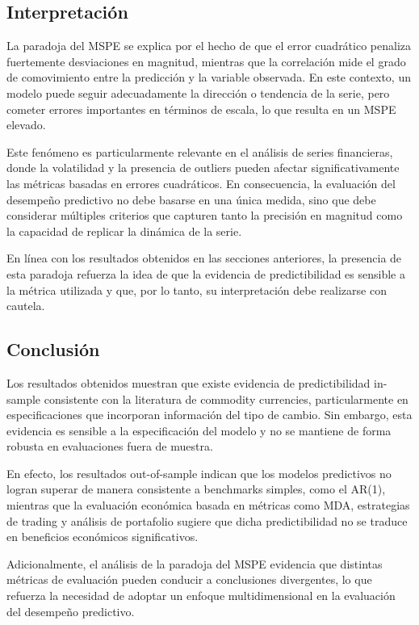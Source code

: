 \documentclass[11pt,a4paper]{article}
\begin{document}
	\subsection{Interpretación}
	La paradoja del MSPE se explica por el hecho de que el error cuadrático penaliza fuertemente desviaciones en magnitud, mientras que la correlación mide el grado de comovimiento entre la predicción y la variable observada. En este contexto, un modelo puede seguir adecuadamente la dirección o tendencia de la serie, pero cometer errores importantes en términos de escala, lo que resulta en un MSPE elevado.
	
	Este fenómeno es particularmente relevante en el análisis de series financieras, donde la volatilidad y la presencia de outliers pueden afectar significativamente las métricas basadas en errores cuadráticos. En consecuencia, la evaluación del desempeño predictivo no debe basarse en una única medida, sino que debe considerar múltiples criterios que capturen tanto la precisión en magnitud como la capacidad de replicar la dinámica de la serie.
	
	En línea con los resultados obtenidos en las secciones anteriores, la presencia de esta paradoja refuerza la idea de que la evidencia de predictibilidad es sensible a la métrica utilizada y que, por lo tanto, su interpretación debe realizarse con cautela.
	
	\subsection{Conclusión}
	
	Los resultados obtenidos muestran que existe evidencia de predictibilidad in-sample consistente con la literatura de commodity currencies, particularmente en especificaciones que incorporan información del tipo de cambio. Sin embargo, esta evidencia es sensible a la especificación del modelo y no se mantiene de forma robusta en evaluaciones fuera de muestra.
	
	En efecto, los resultados out-of-sample indican que los modelos predictivos no logran superar de manera consistente a benchmarks simples, como el AR(1), mientras que la evaluación económica basada en métricas como MDA, estrategias de trading y análisis de portafolio sugiere que dicha predictibilidad no se traduce en beneficios económicos significativos.
	
	Adicionalmente, el análisis de la paradoja del MSPE evidencia que distintas métricas de evaluación pueden conducir a conclusiones divergentes, lo que refuerza la necesidad de adoptar un enfoque multidimensional en la evaluación del desempeño predictivo.
	
\end{document}

